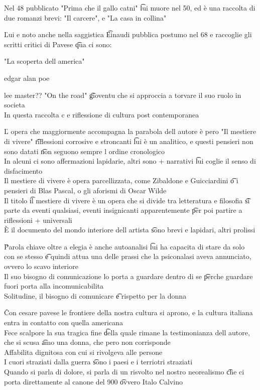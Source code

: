 \documentclass[12pt]{article}
\begin{document}
Nel 48 pubblicato "Prima che il gallo catni" \t lui muore nel 50, ed è una raccolta di due romanzi brevi: "Il carcere", e "La casa in collina"

\v

Lui e noto anche nella saggistica \t Einaudi pubblica postumo nel 68 e raccoglie gli scritti critici di Pavese \t qua ci sono:
\bi
  \item "La scoperta dell america"
  \item edgar alan poe
  \item lee master??
\ei
"On the road" \t gioventu che si approccia a torvare il suo ruolo in societa \\
In questa raccolta c e riflessione di cultura post contemporanea

\v

L opera che maggiormente accompagna la parabola dell autore è pero "Il mestiere di vivere" \t riflessioni corrosive e stroncanti \t lui è un analitico, e questi pensieri non sono datati \t non seguono sempre l ordine cronologico \\
In alcuni ci sono affermazioni lapidarie, altri sono + narrativi \t lui coglie il senso di disfacimento \\
Il mestiere di vivere è opera parcellizzata, come Zibaldone e Guicciardini \t o i pensieri di Blas Pascal, o gli aforismi di Oscar Wilde \\
Il titolo \t il mestiere di vivere è un opera che si divide tra letteratura e filosofia \t si parte da eventi qualsiasi, eventi insignicanti apparentemente \t per poi partire a riflessioni + universali \\
È il documento del mondo interiore dell artista \t sono brevi e lapidari, altri prolissi

\v

Parola chiave oltre a elegia è anche autoanalisi \t lui ha capacita di stare da solo con se stesso \t e quindi attua una delle prassi che la psiconalasi aveva annunciato, ovvero lo scavo interiore \\
Il suo bisogno di comunicazione lo porta a guardare dentro di se \t perche guardare fuori porta alla incomunicabilita \\
Solitudine, il bisogno di comunicare \t e rispetto per la donna

\v

Con cesare pavese le frontiere della nostra cultura si aprono, e la cultura italiana entra in contatto con quella americana \\
Fece scalpore la sua tragica fine \t della quale rimane la testimonianza dell autore, che si scusa \t amo una donna, che pero non corrisponde \\
Affabilita dignitosa con cui si rivolgeva alle persone \\
I cuori straziati dalla guerra \t sono i paesi e i terriotri straziati \\
Quando si parla di dolore, si parla di un risvolto nel nostro neorealismo \t che ci porta direttamente al canone del 900 \t ovvero Italo Calvino
\end{document}
